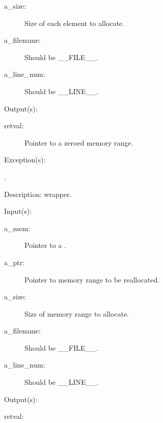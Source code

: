 \begin{capi}
\begin{capilist}
\begin{description}
		\item[a\_size: ]
			Size of each element to allocate.
		\item[a\_filename: ]
			Should be \_\_FILE\_\_.
		\item[a\_line\_num: ]
			Should be \_\_LINE\_\_.
		\end{description}
	\item[Output(s): ]
		\begin{description}\item[]
		\item[retval: ]
			Pointer to a zeroed memory range.
		\end{description}
	\item[Exception(s): ]
		\begin{description}\item[]
		\item[.]
		\end{description}
	\item[Description: ]
		 wrapper.
	\end{capilist}
\label{mem_realloc_e}
\label{mem_realloc}
\label{_cw_realloc}
	\begin{capilist}
	\item[Input(s): ]
		\begin{description}\item[]
		\item[a\_mem: ]
			Pointer to a .
		\item[a\_ptr: ]
			Pointer to memory range to be reallocated.
		\item[a\_size: ]
			Size of memory range to allocate.
		\item[a\_filename: ]
			Should be \_\_FILE\_\_.
		\item[a\_line\_num: ]
			Should be \_\_LINE\_\_.
		\end{description}
	\item[Output(s): ]
		\begin{description}\item[]
		\item[retval: ]

\end{description}
\end{capilist}
\end{capi}
